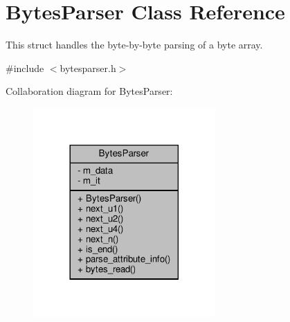 \hypertarget{classBytesParser}{}\section{Bytes\+Parser Class Reference}
\label{classBytesParser}


This struct handles the byte-\/by-\/byte parsing of a byte array.  




{\ttfamily \#include $<$bytesparser.\+h$>$}



Collaboration diagram for Bytes\+Parser\+:
\nopagebreak
\begin{figure}[H]
\begin{center}
\leavevmode
\includegraphics[width=197pt]{classBytesParser__coll__graph}
\end{center}
\end{figure}
